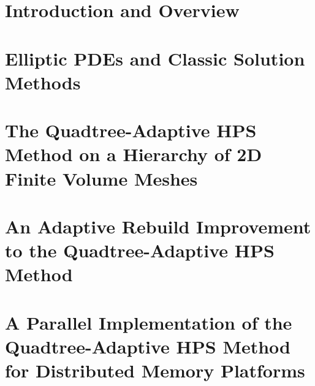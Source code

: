 \documentclass[12pt,twoside]{report}
\begin{document}

\begintext
\chapter{Introduction and Overview}
\label{chap:intro}





\chapter{Elliptic PDEs and Classic Solution Methods}
\label{chap:elliptic-pdes}




\chapter{The Quadtree-Adaptive HPS Method on a Hierarchy of 2D Finite Volume Meshes}
\label{chap:qahps}






\chapter{An Adaptive Rebuild Improvement to the Quadtree-Adaptive HPS Method}
\label{chap:adaptive-build}






\chapter{A Parallel Implementation of the Quadtree-Adaptive HPS Method for Distributed Memory Platforms}
\label{chap:parallel}





\end{document}

